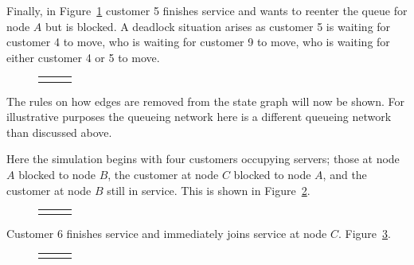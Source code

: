 \documentclass{article}
\begin{document}
Finally, in Figure~\ref{fig:general_buildup_5} customer 5 finishes service and wants to reenter the queue for node $A$ but is blocked.
A deadlock situation arises as customer 5 is waiting for customer 4 to move, who is waiting for customer 9 to move, who is waiting for either customer 4 or 5 to move.

\begin{figure}[H]
  \begin{tabular}{ c c c }
       & \hspace{0.1\textwidth} &
       \\
  \end{tabular}
  \caption{}
  \label{fig:general_buildup_5}
\end{figure}

The rules on how edges are removed from the state graph will now be shown.
For illustrative purposes the queueing network here is a different queueing network than discussed above.

Here the simulation begins with four customers occupying servers; those at node $A$ blocked to node $B$, the customer at node $C$ blocked to node $A$, and the customer at node $B$ still in service.
This is shown in Figure~\ref{fig:general_builddown_1}.

\begin{figure}[H]
  \begin{center}
    \begin{tabular}{ c c c }
       & \hspace{0.1\textwidth} &
       \\
  \end{tabular}
  \end{center}
  \caption{}
  \label{fig:general_builddown_1}
\end{figure}

Customer 6 finishes service and immediately joins service at node $C$. Figure~\ref{fig:general_builddown_2}.

\begin{figure}[H]
  \begin{center}
    \begin{tabular}{ c c c }
       & \hspace{0.1\textwidth} &
       \\
  \end{tabular}
  \end{center}
  \caption{}
  \label{fig:general_builddown_2}
\end{figure}
\end{document}
